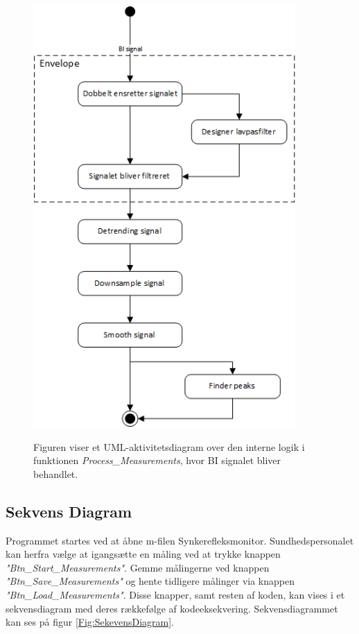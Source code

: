 \begin{figure}[H]
\centering
{\includegraphics[width=10cm]
{Figure/designSWenvelope}}
\caption{Figuren viser et UML-aktivitetsdiagram over den interne logik i funktionen \textit{Process\_Measurements}, hvor BI signalet bliver behandlet. }
\label{fig:designSWenvelope}
\end{figure}


\subsection{Sekvens Diagram}

Programmet startes ved at åbne m-filen Synkerefleksmonitor. Sundhedspersonalet kan herfra vælge at igangsætte en måling ved at trykke knappen \textit{"Btn\_Start\_Measurements"}. Gemme målingerne ved knappen \textit{"Btn\_Save\_Measurements"} og hente tidligere målinger via knappen \textit{"Btn\_Load\_Measurements"}. Disse knapper, samt resten af koden, kan vises i et sekvensdiagram med deres rækkefølge af kodeeksekvering. Sekvensdiagrammet kan ses på figur \ref{Fig:SekevensDiagram}.


